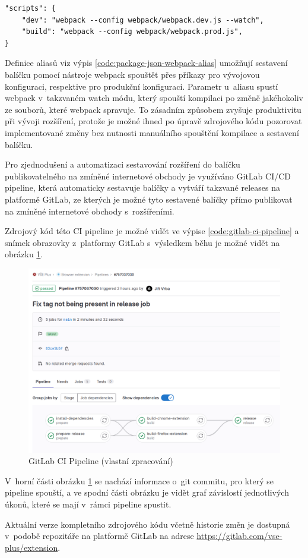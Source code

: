 \begin{lstlisting}[label={code:package-json-webpack-alias}, caption={Definice aliasů pro práci s~nástrojem webpack (vlastní zpracování)}]
"scripts": {
    "dev": "webpack --config webpack/webpack.dev.js --watch",
    "build": "webpack --config webpack/webpack.prod.js",
}
\end{lstlisting}

Definice aliasů viz výpis \ref{code:package-json-webpack-alias} umožňují sestavení balíčku pomocí nástroje webpack spouštět přes příkazy  pro vývojovou konfiguraci, respektive  pro produkční konfiguraci. Parametr  u~aliasu  spustí webpack v~takzvaném watch módu, který spouští kompilaci po změně jakéhokoliv ze souborů, které webpack spravuje. To zásadním způsobem zvyšuje produktivitu při vývoji rozšíření, protože je možné ihned po úpravě zdrojového kódu pozorovat implementované změny bez nutnosti manuálního spouštění kompilace a sestavení balíčku.

Pro zjednodušení a automatizaci sestavování rozšíření do balíčku publikovatelného na zmíněné internetové obchody je využíváno GitLab CI/CD pipeline, která automaticky sestavuje balíčky a vytváří takzvané releases na platformě GitLab, ze kterých je možné tyto sestavené balíčky přímo publikovat na zmíněné internetové obchody s~rozšířeními. 

Zdrojový kód této CI pipeline je možné vidět ve výpise \ref{code:gitlab-ci-pipeline} a snímek obrazovky z~platformy GitLab s~výsledkem běhu je možné vidět na obrázku \ref{fig:extension-gitlab-ci}. 

\begin{figure}[htbp!]\centering
    \includegraphics[width=\textwidth]{img/extension-gitlab-ci-pipeline-overview.png}
    \caption{GitLab CI Pipeline (vlastní zpracování)}
    \label{fig:extension-gitlab-ci}
\end{figure}

V~horní části obrázku \ref{fig:extension-gitlab-ci} se nachází informace o~git commitu, pro který se pipeline spouští, a ve spodní části obrázku je vidět graf závislostí jednotlivých úkonů, které se mají v~rámci pipeline spustit.

Aktuální verze kompletního zdrojového kódu včetně historie změn je dostupná v~podobě repozitáře na platformě GitLab na adrese \url{https://gitlab.com/vse-plus/extension}.
